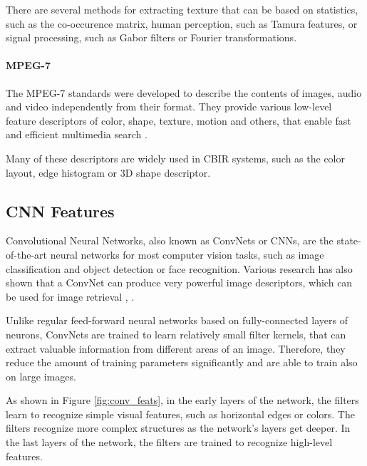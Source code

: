\documentclass[12pt]{report}
\begin{document}
There are several methods for extracting texture that can be based on statistics, such as the co-occurence matrix, human perception, such as Tamura features, or signal processing, such as Gabor filters or Fourier transformations.

\paragraph{MPEG-7}
The MPEG-7 standards were developed to describe the contents of images, audio and video independently from their format. They provide various low-level feature descriptors of color, shape, texture, motion and others, that enable fast and efficient multimedia search \cite{noauthor_visual_nodate}.

Many of these descriptors are widely used in CBIR systems, such as the color layout, edge histogram or 3D shape descriptor.

\pagebreak
\subsection{CNN Features}
Convolutional Neural Networks, also known as ConvNets or CNNs, are the state-of-the-art neural networks for most computer vision tasks, such as image classification and object detection or face recognition. Various research has also shown that a ConvNet can produce very powerful image descriptors, which can be used for image retrieval \cite{razavian_cnn_2014-2}, \cite{NIPS2012_4824}.

Unlike regular feed-forward neural networks based on fully-connected layers of neurons, ConvNets are trained to learn relatively small filter kernels, that can extract valuable information from different areas of an image. Therefore, they reduce the amount of training parameters significantly and are able to train also on large images.

As shown in Figure \ref{fig:conv_feats}, in the early layers of the network, the filters learn to recognize simple visual features, such as horizontal edges or colors. The filters recognize more complex structures as the network's layers get deeper. In the last layers of the network, the filters are trained to recognize high-level features. 
\end{document}
